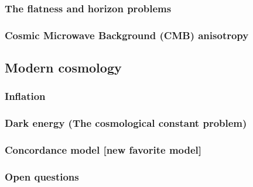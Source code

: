 \documentclass{article}
\theoremstyle{definition}
\begin{document}
\subsubsection{The flatness and horizon problems}
\subsubsection{Cosmic Microwave Background (CMB) anisotropy}
\subsection{Modern cosmology}
\subsubsection{Inflation}
\subsubsection{Dark energy (The cosmological constant problem)}
\subsubsection{Concordance model [new favorite model]}
\subsubsection{Open questions}

\newpage
 
\end{document}
